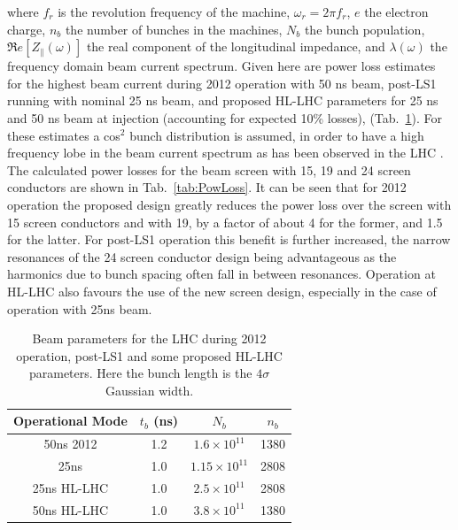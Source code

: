 \documentclass{JAC2003}
\begin{document}
where $f_{r}$ is the revolution frequency of the machine, $\omega_{r}=2\pi f_{r}$, $e$ the electron charge, $n_{b}$ the number of bunches in the machines, $N_{b}$ the bunch population, $\Re{}e[Z_{\parallel}(\omega )]$ the real component of the longitudinal impedance, and $\lambda (\omega )$ the frequency domain beam current spectrum. Given here are power loss estimates for the highest beam current during 2012 operation with 50 ns beam, post-LS1 running with nominal 25 ns beam, and proposed HL-LHC parameters for 25 ns and 50 ns beam at injection (accounting for expected 10\% losses), (Tab.~\ref{tab:BrenHLPara}). For these estimates a cos$^{2}$ bunch distribution is assumed, in order to have a high frequency lobe in the beam current spectrum as has been observed in the LHC \cite{LHCRF}. The calculated power losses for the beam screen with 15, 19 and 24 screen conductors are shown in Tab.~\ref{tab:PowLoss}. It can be seen that for 2012 operation the proposed design greatly reduces the power loss over the screen with 15 screen conductors and with 19, by a factor of about 4 for the former, and 1.5 for the latter. For post-LS1 operation this benefit is further increased, the narrow resonances of the 24 screen conductor design being advantageous as the harmonics due to bunch spacing often fall in between resonances. Operation at HL-LHC also favours the use of the new screen design, especially in the case of operation with 25ns beam.

\begin{table}
\caption{Beam parameters for the LHC during 2012 operation, post-LS1 and some proposed HL-LHC parameters. Here the bunch length is the $4\sigma$ Gaussian width.}
\label{tab:BrenHLPara}
\begin{center}
\begin{tabular}{c | c | c | c }
Operational Mode & $t_{b}$ (ns) & $N_{b}$ & $n_{b}$ \\ \hline
50ns 2012 & 1.2 & $1.6 \times 10^{11}$ & 1380 \\ \hline
25ns & 1.0 & $1.15 \times 10^{11}$ & 2808 \\ \hline
25ns HL-LHC & 1.0 &  $2.5 \times 10^{11}$ & 2808 \\ \hline
50ns HL-LHC & 1.0 &  $3.8 \times 10^{11}$ & 1380 \\ 
\end{tabular}
\end{center}
\end{table}
\end{document}
